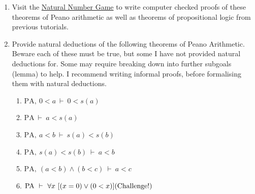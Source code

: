 \documentclass[11pt]{report}
\newcommand{\PA}{\text{PA}}
\begin{document}
\begin{enumerate}
	For this reason, once the wff $P(x)$ is identified, it suffices to provide the base case deduction $\mathcal{D}_{BC}$ and induction step $\mathcal{D}_{IS}$. The sequents are stated in such a way as to mean induction on the variable $x$ will be the easiest approach. Always do induction on the variable $x$.  
	
	\begin{enumerate}
		\item $\text{PA} \vdash \forall x \ (0 + x = x)$
		\item $\text{PA} \vdash \forall x \ (0 \times x = 0)$
		\item $\text{PA} \vdash \forall x \ (1 \times x = x)$
		\item $\text{PA} \vdash \forall x \ (x = 0 \lor \exists y (x = s(y)))$ \hfill (Challenge!)
		\item $\text{PA} \vdash \forall x \ \forall y \ [s(y) + x = s(y+x)]$ \hfill (Challenge!)
		\item $\text{PA} \vdash \forall x \ \forall y \ \forall z \ [(y + z) + x = y + (z + x)]$ \hfill (Challenge!)
		\item $\text{PA} \vdash \forall x \ \forall y \ [y + x = x + y]$ \hfill (Challenge!)
	\end{enumerate}

	\item Visit the \href{https://adam.math.hhu.de/\#/g/leanprover-community/nng4}{Natural Number Game} to write computer checked proofs of these theorems of Peano arithmetic as well as theorems of propositional logic from previous tutorials. 
	 
	\item Provide natural deductions of the following theorems of Peano Arithmetic. Beware each of these must be true, but some I have not provided natural deductions for. Some may require breaking down into further subgoals (lemma) to help. I recommend writing informal proofs, before formalising them with natural deductions.
	
		\begin{enumerate}
			\item $\PA , \ 0 < a \ \vdash \ 0 < s(a)$
			\item $\PA \ \vdash \ a < s(a)$
			\item $\PA , \ a < b \ \vdash \ s(a) < s(b)$
			\item $\PA , \ s(a) < s(b) \ \vdash \ a < b$
			\item $\PA , \ (a < b) \land (b < c) \ \vdash \ a < c$
			\item $\PA \ \vdash \ \forall x \ [(x = 0) \lor (0 < x)] \hfill \text{(Challenge!)}$
		\end{enumerate}
	 
\end{enumerate}	
\end{document}
